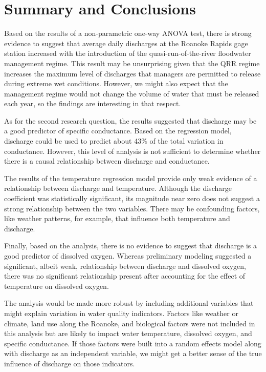 \documentclass[12pt,]{article}
\begin{document}
\hypertarget{summary-and-conclusions}{%
\section{Summary and Conclusions}\label{summary-and-conclusions}}

Based on the results of a non-parametric one-way ANOVA test, there is
strong evidence to suggest that average daily discharges at the Roanoke
Rapids gage station increased with the introduction of the
quasi-run-of-the-river floodwater management regime. This result may be
unsurprising given that the QRR regime increases the maximum level of
discharges that managers are permitted to release during extreme wet
conditions. However, we might also expect that the management regime
would not change the volume of water that must be released each year, so
the findings are interesting in that respect.

As for the second research question, the results suggested that
discharge may be a good predictor of specific conductance. Based on the
regression model, discharge could be used to predict about 43\% of the
total variation in conductance. However, this level of analysis is not
sufficient to determine whether there is a causal relationship between
discharge and conductance.

The results of the temperature regression model provide only weak
evidence of a relationship between discharge and temperature. Although
the discharge coefficient was statistically significant, its magnitude
near zero does not suggest a strong relationship between the two
variables. There may be confounding factors, like weather patterns, for
example, that influence both temperature and discharge.

Finally, based on the analysis, there is no evidence to suggest that
discharge is a good predictor of dissolved oxygen. Whereas preliminary
modeling suggested a significant, albeit weak, relationship between
discharge and dissolved oxygen, there was no significant relationship
present after accounting for the effect of temperature on dissolved
oxygen.

The analysis would be made more robust by including additional variables
that might explain variation in water quality indicators. Factors like
weather or climate, land use along the Roanoke, and biological factors
were not included in this analysis but are likely to impact water
temperature, dissolved oxygen, and specific conductance. If those
factors were built into a random effects model along with discharge as
an independent variable, we might get a better sense of the true
influence of discharge on those indicators.
\end{document}
